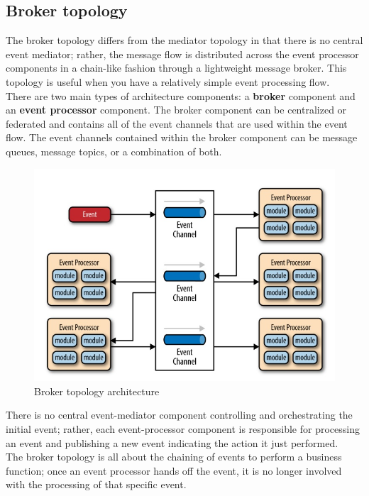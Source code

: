 \subsection{Broker topology}
The broker topology differs from the mediator topology in that there is no central event mediator; rather, the message flow is distributed across the event processor components in a chain-like fashion through a lightweight message broker. This topology is useful when you have a relatively simple event processing flow. \\
There are two main types of architecture components: a \textbf{broker} component and an \textbf{event processor} component. The broker component can be centralized or federated and contains all of the event channels that are used within the event flow. The event channels contained within the broker component can be message queues, message topics, or a combination of both.

\begin{figure} [H]
	\centering
	\includegraphics[scale=1]{Img/broker-topology}
	\caption{Broker topology architecture}\label{}
\end{figure}

There is no central event-mediator component controlling and orchestrating the initial event; rather, each event-processor component is responsible for processing an event and publishing a new event indicating the action it just performed. \\
The broker topology is all about the chaining of events to perform a business function; once an event processor hands off the event, it is no longer involved with the processing of that specific event.


